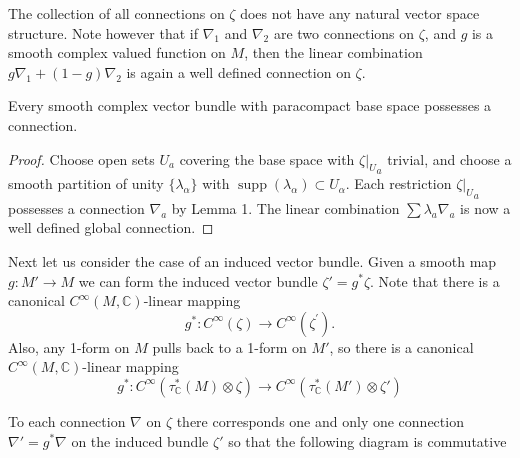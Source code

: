 \documentclass[../main]{subfiles}
\begin{document}
The collection of all connections on $\zeta$ does not have any natural vector space structure. Note however that if $\nabla_{1}$ and $\nabla_{2}$ are two connections on $\zeta$, and $g$ is a smooth complex valued function on $M$, then the linear combination \newline $g \nabla_{1}+(1-g) \nabla_{2}$ is again a well defined connection on $\zeta$.

\begin{lemma}
Every smooth complex vector bundle with paracompact base space possesses a connection.
\end{lemma}

\begin{proof}
Choose open sets $U_{a}$ covering the base space with $\zeta {|_U}_a$ trivial, and choose a smooth partition of unity $\{\lambda_{\alpha}\}$ with $\operatorname{supp}(\lambda_{\alpha}) \subset U_{\alpha}$. Each restriction $\zeta {|_U}_{a}$ possesses a connection $\nabla_{a}$ by Lemma 1. The linear combination $\sum \lambda_{a} \nabla_{a}$ is now a well defined global connection.
\end{proof}

Next let us consider the case of an induced vector bundle. Given a smooth map $g:M' \rightarrow M$ we can form the induced vector bundle $\zeta'=g^{*} \zeta$. Note that there is a canonical $C^\infty (M, \mathbb{C})$-linear mapping
\[
g^{*}: C^\infty (\zeta) \rightarrow C^\infty (\zeta^{'}) .
\]
Also, any 1-form on $M$ pulls back to a 1-form on $M'$, so there is a canonical $C^\infty (M, \mathbb{C})$-linear mapping
\[
g^{*}: C^\infty (\tau_{\mathbb{C}}^{*}(M) \otimes \zeta) \rightarrow C^\infty (\tau^{*}_\mathbb{C}(M') \otimes \zeta')
\]

\begin{lemma}
To each connection $\nabla$ on $\zeta$ there corresponds one and only one connection $\nabla '= g^{*} \nabla$ on the induced bundle $\zeta '$ so that the following diagram is commutative

\begin{center}
\end{center}
\end{lemma}
\end{document}
